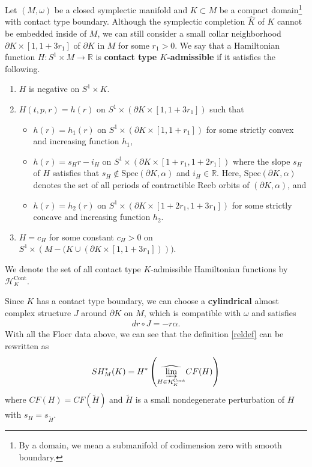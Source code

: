 \documentclass[12pt]{amsart}
\theoremstyle{definition}
\newcommand{\RR}{{\mathbb R}}
\begin{document}
Let $(M, \omega)$ be a closed symplectic manifold and $K \subset M$ be a compact domain\footnote{By a domain, we mean a submanifold of codimension zero with smooth boundary.} with contact type boundary. Although the symplectic completion $\widehat{K}$ of $K$ cannot be embedded inside of $M$, we can still consider a small collar neighborhood $\partial K \times [1,1+3r_1]$ of $\partial K$ in $M$ for some $r_1 >0$. We say that a Hamiltonian function $H : S^1 \times M \to \RR$ is \textbf{contact type $K$-admissible} if it satisfies the following.\vspace{0.2 cm}
\begin{enumerate}[label=(A\arabic*)]
    \item $H$ is negative on $S^1 \times K$.\vspace{0.2 cm}
    \item $H(t, p, r) =  h(r)$ on $S^1 \times \left(\partial K \times [1, 1+3r_1]\right)$ such that\vspace{0.3 cm}
    \begin{itemize}
        \item $ h(r)=h_1(r)$ on $S^1 \times \left(\partial K \times [1, 1+r_1]\right)$ for some strictly convex and increasing function $h_1$,\vspace{0.2 cm}
        \item $h(r) = s_Hr - i_H$ on $S^1 \times (\partial K \times [1+r_1, 1+2r_1])$ where the slope $s_H$ of $H$ satisfies that $s_H \notin \text{Spec}(\partial K, \alpha)$ and $i_H \in \RR$. Here, $\text{Spec}(\partial K, \alpha)$ denotes the set of all periods of contractible Reeb orbits of $(\partial K, \alpha)$, and\vspace{0.2 cm}
        \item $h(r) = h_2(r)$ on $S^1 \times \left(\partial K \times [1+2r_1,1+3r_1]\right)$ for some strictly concave and increasing function $h_2$.\vspace{0.2 cm}
    \end{itemize}
        \item $H= c_H$ for some constant $c_H >0$ on $S^1 \times \left(M - (K \cup \left(\partial K \times [1,1+3r_1]\right)\right))$.\vspace{0.2 cm}
\end{enumerate}
 We denote the set of all contact type $K$-admissible Hamiltonian functions by $\mathcal{H}^{\text{Cont}}_K$. 

\vspace{0.2 cm}


 Since $K$ has a contact type boundary, we can choose a \textbf{cylindrical} almost complex structure $J$ around $\partial K$ on $M$, which is compatible with $\omega$ and satisfies
 \begin{align*}
     dr \circ J = -r \alpha.
 \end{align*}
With all the Floer data above, we can see that the definition \eqref{reldef} can be rewritten as
 \begin{align}\label{reldef2}
      SH^*_M(K) = H^* \left( \widehat{\varinjlim_{H \in \mathcal{H}^{\text{Cont}}_K}} CF(H) \right)
 \end{align}
where $CF(H) = CF(\widetilde{H})$ and $\widetilde{H}$ is a small nondegenerate perturbation of $H$ with $s_H = s_{\widetilde{H}}$. 
\end{document}
